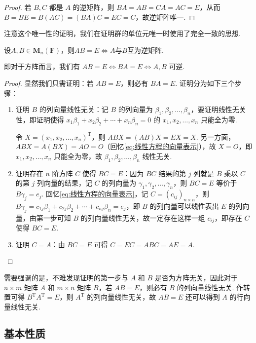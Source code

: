\begin{proof}
    若 $B,C$ 都是 $A$ 的逆矩阵，则 $BA=AB=CA=AC=E$，从而 $B=BE=B(AC)=(BA)C=EC=C$，故逆矩阵唯一.
\end{proof}
注意这个唯一性的证明，我们在证明群的单位元唯一时使用了完全一致的思想.

\begin{theorem}{}{}
    设$A,B\in \mathbf{M}_n(\mathbf{F})$，则$AB=E \iff A$与$B$互为逆矩阵.
\end{theorem}
即对于方阵而言，我们有 $AB = E \iff BA = E \iff A, B$ 可逆.
\begin{proof}
    显然我们只需证明：若 $AB = E$，则必有 $BA = E$. 证明分为如下三个步骤：
    \begin{enumerate}
        \item 证明 $B$ 的列向量线性无关：记 $B$ 的列向量为 $\beta_1,\beta_2,\ldots,\beta_n$，要证明线性无关性，即证明使得 $x_1\beta_1 + x_2\beta_2 + \cdots + x_n\beta_n = 0$ 的 $x_1,x_2,\ldots,x_n$ 只能全为零.

        令 $X = (x_1,x_2,\ldots,x_n)^\mathrm{T}$，则 $ABX = (AB)X = EX = X$. 另一方面，$ABX = A(BX) = AO = O$（回忆\autoref{eq:线性方程的向量表示}），故 $X = O$，即 $x_1,x_2,\ldots,x_n$ 只能全为零，故 $\beta_1,\beta_2,\ldots,\beta_n$ 线性无关.

        \item 证明存在 $n$ 阶方阵 $C$ 使得 $BC = E$：因为 $BC$ 结果的第 $j$ 列就是 $B$ 乘以 $C$ 的第 $j$ 列向量的结果，记 $C$ 的列向量为 $\gamma_1,\gamma_2,\ldots,\gamma_n$，则 $BC = E$ 等价于 $B\gamma_j = e_j$. 回忆\autoref{eq:线性方程的向量表示}，记 $C = (c_{ij})_{n \times n}$，则 $B\gamma_j = c_{1j}\beta_1 + c_{2j}\beta_2 + \cdots + c_{nj}\beta_n = e_j$，即 $B$ 的列向量可以线性表出 $E$ 的列向量，由第一步可知 $B$ 的列向量线性无关，故一定存在这样一组 $c_{ij}$，即存在 $C$ 使得 $BC = E$.

        \item 证明 $C = A$：由 $BC = E$ 可得 $C = EC = ABC = AE = A$.
    \end{enumerate}
\end{proof}

需要强调的是，不难发现证明的第一步与 $A$ 和 $B$ 是否为方阵无关，因此对于 $n \times m$ 矩阵 $A$ 和 $m \times n$ 矩阵 $B$，若 $AB = E$，则必有 $B$ 的列向量线性无关. 作转置可得 $B^\mathrm{T}A^\mathrm{T} = E$，则 $A^\mathrm{T}$ 的列向量线性无关，故 $AB = E$ 还可以得到 $A$ 的行向量线性无关.

\subsection{基本性质}

